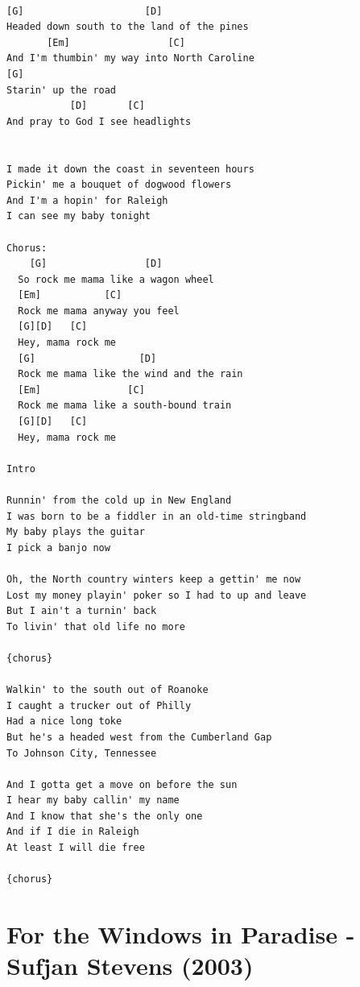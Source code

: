 \documentclass[
]{book}
\let\stdsection\section
\renewcommand\section{\clearpage\stdsection}
\begin{document}
\begin{verbatim}

[G]                     [D]
Headed down south to the land of the pines
       [Em]                 [C]
And I'm thumbin' my way into North Caroline
[G]
Starin' up the road
           [D]       [C]
And pray to God I see headlights


I made it down the coast in seventeen hours 
Pickin' me a bouquet of dogwood flowers 
And I'm a hopin' for Raleigh 
I can see my baby tonight

Chorus:
    [G]                 [D]
  So rock me mama like a wagon wheel
  [Em]           [C]
  Rock me mama anyway you feel
  [G][D]   [C]
  Hey, mama rock me
  [G]                  [D]
  Rock me mama like the wind and the rain
  [Em]               [C]
  Rock me mama like a south-bound train
  [G][D]   [C]
  Hey, mama rock me

Intro

Runnin' from the cold up in New England
I was born to be a fiddler in an old-time stringband
My baby plays the guitar
I pick a banjo now

Oh, the North country winters keep a gettin' me now
Lost my money playin' poker so I had to up and leave
But I ain't a turnin' back
To livin' that old life no more

{chorus}

Walkin' to the south out of Roanoke
I caught a trucker out of Philly
Had a nice long toke
But he's a headed west from the Cumberland Gap
To Johnson City, Tennessee

And I gotta get a move on before the sun
I hear my baby callin' my name
And I know that she's the only one
And if I die in Raleigh
At least I will die free

{chorus}
\end{verbatim}

\hypertarget{for-the-windows-in-paradise---sufjan-stevens-2003}{%
\section{For the Windows in Paradise - Sufjan Stevens (2003)}\label{for-the-windows-in-paradise---sufjan-stevens-2003}}
\end{document}
